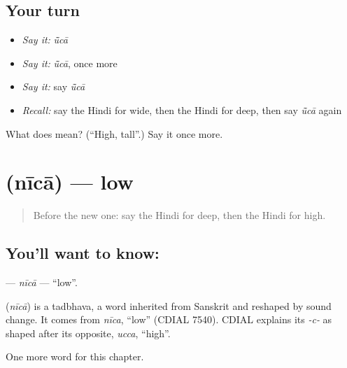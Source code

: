 \subsection*{Your turn}
\begin{itemize}
\raggedright
  \item \emph{Say it:} \emph{ū̃cā}
  \item \emph{Say it:} \emph{ū̃cā}, once more
  \item \emph{Say it:} say \emph{ū̃cā}
  \item \emph{Recall:} say the Hindi for wide, then the Hindi for deep, then say \emph{ū̃cā} again
\end{itemize}

\begin{tcolorbox}[breakable,colback=teal!4,colframe=teal!35!black,title={Before you move on}]
What does  mean? (\textquotedblleft{}High, tall\textquotedblright{}.) Say it once more.
\end{tcolorbox}
\section[\texorpdfstring{\hi{नीचा} (nīcā)}{नीचा (nīcā)}]{ (nīcā) — low}

\label{lesson:HI-C158-nica}



\begin{quote}
Before the new one: say the Hindi for deep, then the Hindi for high.
\end{quote}

\subsection*{You'll want to know: }
\textbf{} — \emph{nīcā} — \textquotedblleft{}low\textquotedblright{}.

\begin{cousinweb}
\textbf{} (\emph{nīcā}) is a tadbhava, a word inherited from Sanskrit and reshaped by sound change. It comes from \emph{nīca}, \textquotedblleft{}low\textquotedblright{} (CDIAL 7540). CDIAL explains its \emph{-c-} as shaped after its opposite, \emph{ucca}, \textquotedblleft{}high\textquotedblright{}.
\end{cousinweb}

\begin{grammarlens}[title={What you've built}]
One more word for this chapter.
\end{grammarlens}

